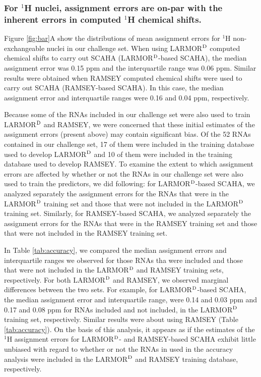 \documentclass[journal=jcisd8,manuscript=article,layout=onecolumn]{achemso}
\begin{document}
\subsubsection{For $^{1}$H nuclei, assignment errors are on-par with the inherent errors in computed $^{1}$H chemical shifts.}  Figure \ref{fig:bar}A show the distributions of mean assignment errors for $^{1}$H non-exchangeable nuclei in our challenge set. When using LARMOR$^{\rm D}$ computed chemical shifts to carry out SCAHA (LARMOR$^{\rm D}$-based SCAHA), the median assignment error was 0.15 ppm and the interquartile range was 0.06 ppm. Similar results were obtained when RAMSEY computed chemical shifts were used to carry out SCAHA (RAMSEY-based SCAHA). In this case, the median assignment error and interquartile ranges were 0.16 and 0.04 ppm, respectively. 

Because some of the RNAs included in our challenge set were also used to train LARMOR$^{\rm D}$ and RAMSEY, we were concerned that these initial estimates of the assignment errors (present above) may contain significant bias. Of the 52 RNAs contained in our challenge set, 17 of them were included in the training database used to develop LARMOR$^{\rm D}$ and 10 of them were included in the training database used to develop RAMSEY. To examine the extent to which assignment errors are affected by whether or not the RNAs in our challenge set were also used to train the predictors, we did following: for LARMOR$^{\rm D}$-based SCAHA, we analyzed separately the assignment errors for the RNAs that were in the LARMOR$^{\rm D}$ training set and those that were not included in the LARMOR$^{\rm D}$ training set. Similarly,  for RAMSEY-based SCAHA, we analyzed separately the assignment errors for the RNAs that were in the RAMSEY training set and those that were not included in the RAMSEY training set.

In Table \ref{tab:accuracy}, we compared the median assignment errors and interquartile ranges we observed for those RNAs tha were included and those that were not included in the LARMOR$^{\rm D}$ and RAMSEY training sets, respectively. For both LARMOR$^{\rm D}$ and RAMSEY, we observed marginal differences between the two sets. For example, for LARMOR$^{\rm D}$-based SCAHA,  the median assignment error and interquartile range, were 0.14 and 0.03 ppm and 0.17 and 0.08 ppm for RNAs included and not included, in the LARMOR$^{\rm D}$ training set, respectively. Similar results were about using RAMSEY (Table \ref{tab:accuracy}). On the basis of this analysis, it appears as if the estimates of the $^{1}$H assignment errors for LARMOR$^{\rm D}$- and RAMSEY-based SCAHA exhibit little unbiased with regard to  whether or not the RNAs in used in the accuracy analysis were included in the LARMOR$^{\rm D}$ and RAMSEY training database, respectively.
\end{document}

